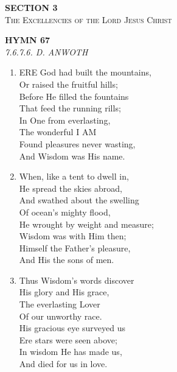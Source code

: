 \newpage
\thispagestyle{empty}
\vspace*{3.5cm}
\begin{center}
    {\LARGE \textbf{SECTION 3}}\\[0.8em]
    {\Large \textsc{The Excellencies of the Lord Jesus Christ}}
\end{center}
\vspace{3.5cm}

\newpage
\begin{center}
    {\Large \textbf{HYMN 67}}
    \\
    \textit{7.6.7.6. D. ANWOTH}
\end{center}
\vspace{1em}

\begin{enumerate}
    \item ERE God had built the mountains, \\
        Or raised the fruitful hills; \\
        Before He filled the fountains \\
        That feed the running rills; \\
        In One from everlasting, \\
        The wonderful I AM \\
        Found pleasures never wasting, \\
        And Wisdom was His name.

    \item When, like a tent to dwell in, \\
        He spread the skies abroad, \\
        And swathed about the swelling \\
        Of ocean's mighty flood, \\
        He wrought by weight and measure; \\
        Wisdom was with Him then; \\
        Himself the Father's pleasure, \\
        And His the sons of men.

    \item Thus Wisdom's words discover \\
        His glory and His grace, \\
        The everlasting Lover \\
        Of our unworthy race. \\
        His gracious eye surveyed us \\
        Ere stars were seen above; \\
        In wisdom He has made us, \\
        And died for us in love.


\end{enumerate}

